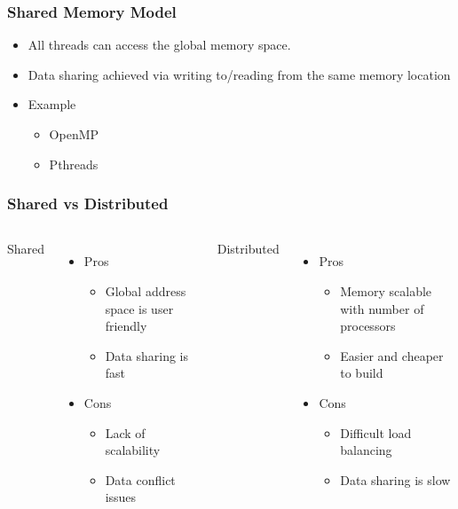 \documentclass[10pt,t]{beamer}
\begin{document}
\begin{frame}
  \frametitle{Shared Memory Model}
    \begin{itemize}
      \item All threads can access the global memory space.
      \item Data sharing achieved via writing to/reading from the same memory location
      \item Example
      \begin{itemize}
        \item OpenMP
        \item Pthreads
      \end{itemize}
    \end{itemize}
    
\end{frame}

\begin{frame}
  \frametitle{Shared vs Distributed}
   \begin{columns}
   \column{5cm}
    \begin{description}
    \item {Shared}
    \end{description}
      \begin{itemize}
        \item Pros
        \begin{itemize}
          \item Global address space is user friendly
          \item Data sharing is fast
        \end{itemize}
        \item Cons
        \begin{itemize}
          \item Lack of scalability
          \item Data conflict issues
        \end{itemize}
      \end{itemize}
    \column{5cm}
    \begin{description}
    \item {Distributed}
    \end{description}
      \begin{itemize}
        \item Pros
        \begin{itemize}
          \item Memory scalable with number of processors
          \item Easier and cheaper to build
        \end{itemize}
        \item Cons
        \begin{itemize}
          \item Difficult load balancing
          \item Data sharing is slow
        \end{itemize}
      \end{itemize}
  \end{columns}
\end{frame}
\end{document}
